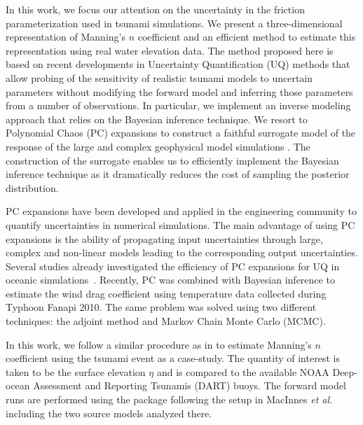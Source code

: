 In this work, we focus our attention on the uncertainty in the friction
parameterization used in tsunami simulations. We present a \alert{three}-dimensional 
representation of Manning's $n$ coefficient and an efficient method
to estimate this representation using real water elevation data. The method proposed here 
is based on recent developments in Uncertainty Quantification (UQ) methods that allow 
probing of the sensitivity of realistic tsunami  models to uncertain parameters
without modifying the forward model and inferring those parameters
from a number of observations.  In particular, we implement an inverse modeling
approach that relies on the Bayesian inference technique.  We resort to
Polynomial Chaos (PC) expansions to construct a faithful surrogate model of the
response of the large and complex geophysical model simulations \cite{Najm:2009,Alexanderian2012,sraj:2013a,sraj:2013b}.
The construction of the surrogate enables us to efficiently implement the Bayesian
inference technique as it dramatically reduces the cost of sampling the
posterior distribution.

PC expansions have been developed and applied in the engineering community to
quantify uncertainties in numerical simulations.  The main advantage of
using PC expansions is the ability of propagating input uncertainties through 
large, complex and non-linear models leading to the corresponding output uncertainties. 
Several studies already investigated the efficiency of PC expansions for 
UQ in oceanic simulations~\citep{thacker2012,ashwanth2010,Alexanderian2012}. 
Recently, PC was combined with Bayesian inference to estimate the wind drag coefficient 
using temperature data collected during Typhoon Fanapi 2010. The same problem was 
solved using two different techniques: the adjoint method and Markov Chain Monte Carlo
(MCMC)\cite{sraj:2013a,sraj:2013b}.

In this work, we follow a similar procedure as in \cite{sraj:2013a,sraj:2013b}
to estimate Manning's $n$ coefficient using the \tohoku tsunami
event as a case-study. The quantity of interest is taken to be the surface
elevation $\eta$ and is compared to the available NOAA Deep-ocean Assessment and
Reporting Tsunamis (DART) buoys.  The forward model runs are performed using the
\geoclaw package following the setup in MacInnes \emph{et al.}~\cite{MacInnes:2013cr} 
including the two source models analyzed there.

